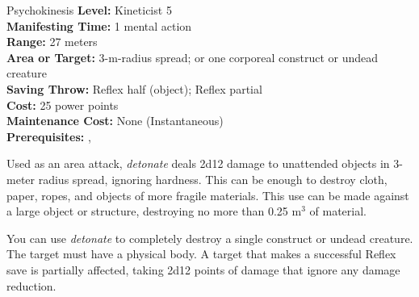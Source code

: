 {Psychokinesis}
{
	\textbf{Level:}
	Kineticist 5\\
	\textbf{Manifesting Time:}
	1 mental action\\
	\textbf{Range:}
	27 meters\\
	\textbf{Area or Target:}
	3-m-radius spread; or one corporeal construct or undead creature\\
	\textbf{Saving Throw:}
	Reflex half (object); Reflex partial\\
	\textbf{Cost:}
	25 power points\\
	\textbf{Maintenance Cost:}
	None (Instantaneous)\\
	\textbf{Prerequisites:}
	, \\
}
{
	Used as an area attack, \emph{detonate} deals 2d12 damage to unattended objects in 3-meter radius spread, ignoring hardness. This can be enough to destroy cloth, paper, ropes, and objects of more fragile materials. This use can be made against a large object or structure, destroying no more than 0.25 m$^3$ of material.

	You can use \emph{detonate} to completely destroy a single construct or undead creature. The target must have a physical body. A target that makes a successful Reflex save is partially affected, taking 2d12 points of damage that ignore any damage reduction.
}